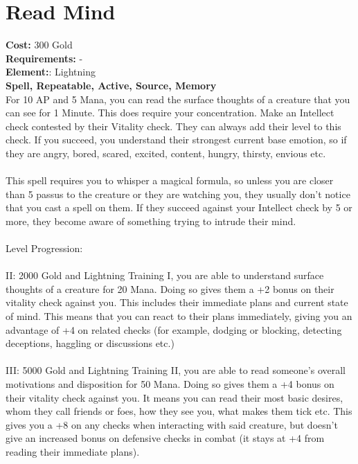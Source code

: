 \section*{Read Mind}
\textbf{Cost:} 300 Gold\\
\textbf{Requirements:} -\\
\textbf{Element:}: Lightning\\
\textbf{Spell, Repeatable, Active, Source, Memory}\\
For 10 AP and 5 Mana, you can read the surface thoughts of a creature that you can see for 1 Minute. This does require your concentration. Make an Intellect check contested by their Vitality check. They can always add their level to this check. If you succeed, you understand their strongest current base emotion, so if they are angry, bored, scared, excited, content, hungry, thirsty, envious etc.\\
\\
This spell requires you to whisper a magical formula, so unless you are closer than 5 passus to the creature or they are watching you, they usually don't notice that you cast a spell on them. If they succeed against your Intellect check by 5 or more, they become aware of something trying to intrude their mind.\\
\\
Level Progression:\\
\\
II: 2000 Gold and Lightning Training I, you are able to understand surface thoughts of a creature for 20 Mana. Doing so gives them a +2 bonus on their vitality check against you. This includes their immediate plans and current state of mind. This means that you can react to their plans immediately, giving you an advantage of +4 on related checks (for example, dodging or blocking, detecting deceptions, haggling or discussions etc.)\\
\\
III: 5000 Gold and Lightning Training II, you are able to read someone's overall motivations and disposition for 50 Mana. Doing so gives them a +4 bonus on their vitality check against you. It means you can read their most basic desires, whom they call friends or foes, how they see you, what makes them tick etc. This gives you a +8 on any checks when interacting with said creature, but doesn't give an increased bonus on defensive checks in combat (it stays at +4 from reading their immediate plans).\\